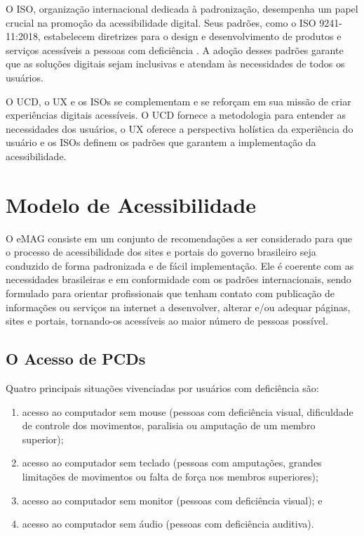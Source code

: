 \documentclass[
  12pt,
  openright,
  twoside,
  a4paper,
  english,
  french,
  spanish,
  brazil
]{abntex2}
\begin{document}
O ISO, organização internacional dedicada à padronização, desempenha um papel
crucial na promoção da acessibilidade digital. Seus padrões, como o ISO
9241-11:2018, estabelecem diretrizes para o design e desenvolvimento de produtos
e serviços acessíveis a pessoas com deficiência \cite{ISO:9241-11:2018}. A
adoção desses padrões garante que as soluções digitais sejam inclusivas e
atendam às necessidades de todos os usuários.

O UCD, o UX e os ISOs se complementam e se reforçam em sua missão de criar
experiências digitais acessíveis. O UCD fornece a metodologia para entender as
necessidades dos usuários, o UX oferece a perspectiva holística da experiência
do usuário e os ISOs definem os padrões que garantem a implementação da
acessibilidade.

\chapter{Modelo de Acessibilidade}

O eMAG consiste em um conjunto de recomendações a ser considerado para que o
processo de acessibilidade dos sites e portais do governo brasileiro seja
conduzido de forma padronizada e de fácil implementação. Ele é coerente com as
necessidades brasileiras e em conformidade com os padrões internacionais, sendo
formulado para orientar profissionais que tenham contato com publicação de
informações ou serviços na internet a desenvolver, alterar  e/ou adequar
páginas, sites e portais, tornando-os acessíveis ao maior número de pessoas
possível.

\section{O Acesso de PCDs}

Quatro principais situações vivenciadas por usuários com deficiência são:

\begin{enumerate}
  \item
    acesso ao computador sem mouse (pessoas com deficiência visual, dificuldade
    de controle dos movimentos, paralisia ou amputação de um membro superior);
  \item
    acesso ao computador sem teclado (pessoas com amputações, grandes limitações
    de movimentos ou falta de força nos membros superiores);
  \item acesso ao computador sem monitor (pessoas com deficiência visual); e
  \item acesso ao computador sem áudio (pessoas com deficiência auditiva).
\end{enumerate}
\end{document}
